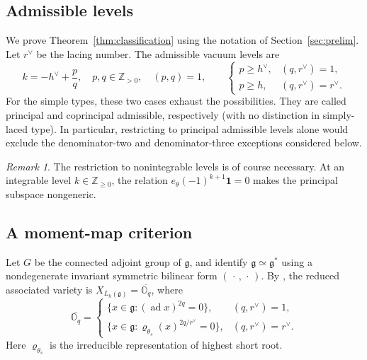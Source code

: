 \documentclass[11pt]{amsart}
\theoremstyle{definition}
\theoremstyle{remark}
\newtheorem{remark}[theorem]{Remark}
\newcommand{\Z}{\mathbb Z}
\newcommand{\g}{\mathfrak g}
\newcommand{\vac}{\mathbf1}
\DeclareMathOperator{\ad}{ad}
\begin{document}
\subsection{Admissible levels}
We prove Theorem~\ref{thm:classification} using the notation of
Section~\ref{sec:prelim}.
Let $r^\vee$ be the lacing number. The admissible vacuum levels are
\begin{equation}\label{eq:admissibility}
 k=-h^\vee+\frac pq,\quad p,q\in\Z_{>0},\quad (p,q)=1,
 \qquad
 \begin{cases}
 p\ge h^\vee,&(q,r^\vee)=1,\\
 p\ge h,&(q,r^\vee)=r^\vee.
 \end{cases}
\end{equation}
For the simple types, these two cases exhaust the possibilities.
They are called principal and coprincipal admissible, respectively
(with no distinction in simply-laced type). In particular, restricting
to principal admissible levels alone would exclude the denominator-two
and denominator-three exceptions considered below.

\begin{remark}
The restriction to nonintegrable levels is of course necessary. At an integrable
level $k\in\Z_{\ge0}$, the relation
$e_\theta(-1)^{k+1}\vac=0$ makes the principal subspace nongeneric.
\end{remark}

\subsection{A moment-map criterion}
Let $G$ be the connected adjoint group of $\mathfrak g$, and identify
$\mathfrak g\simeq\mathfrak g^*$ using a nondegenerate invariant symmetric
bilinear form $(\,\cdot\,,\,\cdot\,)$. 
By
\cite{ArAssoc,AvEM}, the reduced associated variety is
$X_{L_k(\g)}=\overline{\mathbb O_q}$, where
\begin{equation}\label{eq:orbit-description}
 \overline{\mathbb O_q}=
 \begin{cases}
 \{x\in\g:(\ad x)^{2q}=0\},&(q,r^\vee)=1,\\
 \{x\in\g:\varrho_{\theta_s}(x)^{2q/r^\vee}=0\},
 &(q,r^\vee)=r^\vee.
 \end{cases}
\end{equation}
Here $\varrho_{\theta_s}$ is the irreducible representation of highest
short root. 
\end{document}
